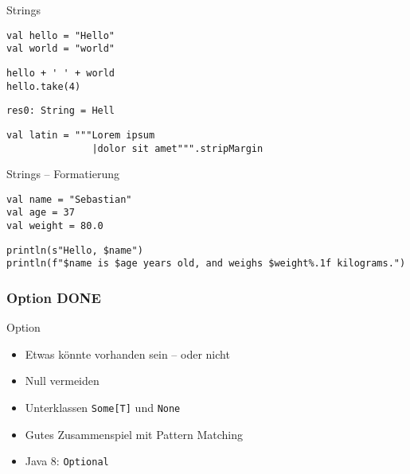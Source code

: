 \documentclass[14pt,aspectratio=169,trans]{beamer} %
\begin{document}
\begin{frame}[fragile]{}
	\begin{block}{Strings}
		\scriptsize
		\onslide<2->
  \begin{lstlisting}
val hello = "Hello"
val world = "world"
	\end{lstlisting}
\begin{lstlisting}[firstnumber=3]
hello + ' ' + world
hello.take(4)
\end{lstlisting}
\begin{lstlisting}[firstnumber=5]
res0: String = Hell
\end{lstlisting}
\begin{lstlisting}[firstnumber=6]
val latin = """Lorem ipsum
               |dolor sit amet""".stripMargin
\end{lstlisting}


\end{block}
	
\end{frame}


\begin{frame}[fragile]{}
	\begin{block}{Strings -- Formatierung}
		\scriptsize
		\onslide<1->
\begin{lstlisting}
val name = "Sebastian"
val age = 37
val weight = 80.0
\end{lstlisting}
\begin{lstlisting}[firstnumber=4]
println(s"Hello, $name")
println(f"$name is $age years old, and weighs $weight%.1f kilograms.")
\end{lstlisting}
	\end{block}
\end{frame}




\subsubsection*{Option DONE}

\begin{frame}{}
	\begin{block}{Option}
		\begin{itemize}
			\item<2->Etwas könnte vorhanden sein -- oder nicht
			\item<3->Null vermeiden
			\item<4->Unterklassen \texttt{Some[T]} und \texttt{None}
			\item<5->Gutes Zusammenspiel mit Pattern Matching
			\item<6->Java 8: \texttt{Optional}
		\end{itemize}
	\end{block}
	\note{}
\end{frame}
\end{document}
